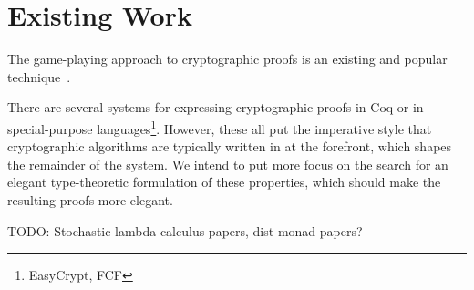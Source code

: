 \section{Existing Work}

The game-playing approach to cryptographic proofs is an existing and popular technique~\cite{codebasedgames}.

There are several systems for expressing cryptographic proofs in Coq or in special-purpose
languages\footnote{EasyCrypt, FCF}.  However, these all put the imperative style that cryptographic algorithms are
typically written in at the forefront, which shapes the remainder of the system.  We intend to put more focus on the
search for an elegant type-theoretic formulation of these properties, which should make the resulting proofs more
elegant.

TODO: Stochastic lambda calculus papers, dist monad papers?
